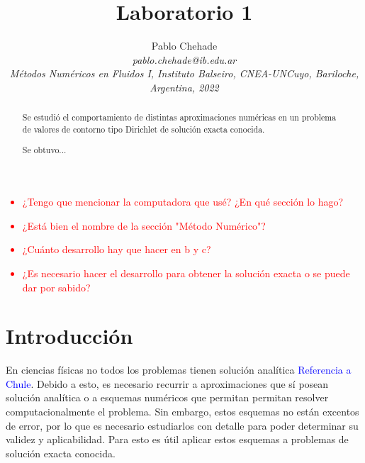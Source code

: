 \documentclass[aps,prb,twocolumn,superscriptaddress,floatfix,longbibliography]{revtex4-2}
\newif\ifptitle
\newif\ifpnumber
\newcounter{para}
\newcommand\ptitle[1]{\par\refstepcounter{para}
{\ifpnumber{\noindent\textcolor{lightgray}{\textbf{\thepara}}\indent}\fi}
{\ifptitle{\textbf{[{#1}]}}\fi}}
\begin{document}
\newcommand{\mytitle}{Laboratorio 1}

\title{\mytitle}

\author{Pablo Chehade \\
    \small \textit{pablo.chehade@ib.edu.ar} \\
    \small \textit{Métodos Numéricos en Fluidos I, Instituto Balseiro, CNEA-UNCuyo, Bariloche, Argentina, 2022} \\}


\begin{abstract}

Se estudió el comportamiento de distintas aproximaciones numéricas en un problema de valores de contorno tipo Dirichlet de solución exacta conocida.


Se obtuvo...

\end{abstract}

\maketitle

\textcolor{red}{
\begin{itemize}
    \item ¿Tengo que mencionar la computadora que usé? ¿En qué sección lo hago?
    \item ¿Está bien el nombre de la sección "Método Numérico"?
    \item ¿Cuánto desarrollo hay que hacer en b y c?
    \item ¿Es necesario hacer el desarrollo para obtener la solución exacta o se puede dar por sabido?
\end{itemize}}

\section{Introducción}
\ptitle{En física, no todos los problemas tienen solución analítica, muchas veces es necesario recurrir a aproximaciones}

En ciencias físicas no todos los problemas tienen solución analítica \textcolor{blue}{Referencia a Chule}. Debido a esto, es necesario recurrir a aproximaciones que sí posean solución analítica o a esquemas numéricos que permitan permitan resolver computacionalmente el problema. Sin embargo, estos esquemas no están excentos de error, por lo que es necesario estudiarlos con detalle para poder determinar su validez y aplicabilidad. Para esto es útil aplicar estos esquemas a problemas de solución exacta conocida.
\end{document}

